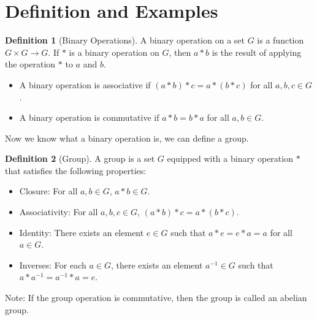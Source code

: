 \documentclass[12pt,a4paper,oneside]{report}
\theoremstyle{definition}
\newtheorem{definition}{Definition}[chapter]
\begin{document}
\section{Definition and Examples} 
\begin{definition}[Binary Operations]
  A binary operation on a set $G$ is a function $G \times G \rightarrow G$. If $*$ is a binary operation on $G$, then $a * b$ is the result of applying the operation $*$ to $a$ and $b$.
  \begin{itemize}
    \item A binary operation is associative if $(a * b) * c = a * (b * c)$ for all $a, b, c \in G$.
    \item A binary operation is commutative if $a * b = b * a$ for all $a, b \in G$.
  \end{itemize}
\end{definition}
Now we know what a binary operation is, we can define a group.  
\begin{definition}[Group]
  A group is a set $G$ equipped with a binary operation $*$ that satisfies the following properties:
  \begin{itemize}
    \item Closure: For all $a, b \in G$, $a * b \in G$.
    \item Associativity: For all $a, b, c \in G$, $(a * b) * c = a * (b * c)$.
    \item Identity: There exists an element $e \in G$ such that $a * e = e * a = a$ for all $a \in G$.
    \item Inverses: For each $a \in G$, there exists an element $a^{-1} \in G$ such that $a * a^{-1} = a^{-1} * a = e$.
  \end{itemize}
\end{definition}
Note: If the group operation is commutative, then the group is called an abelian group.
\end{document}
